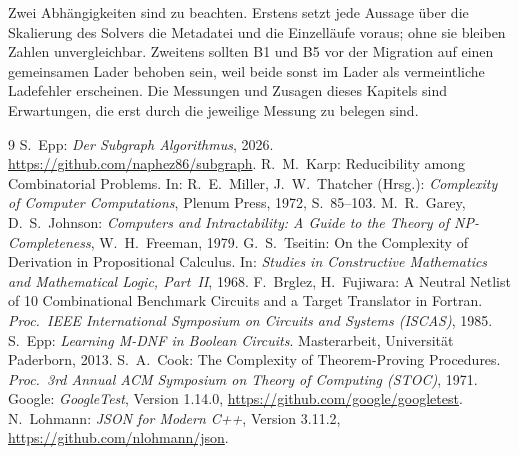 Zwei Abhängigkeiten sind zu beachten. Erstens setzt jede Aussage über die Skalierung des Solvers die Metadatei und die Einzelläufe voraus; ohne sie bleiben Zahlen unvergleichbar. Zweitens sollten B1 und B5 vor der Migration auf einen gemeinsamen Lader behoben sein, weil beide sonst im Lader als vermeintliche Ladefehler erscheinen. Die Messungen und Zusagen dieses Kapitels sind Erwartungen, die erst durch die jeweilige Messung zu belegen sind.

\begin{thebibliography}{9}
	 S.~Epp: \emph{Der Subgraph Algorithmus}, 2026. \url{https://github.com/naphez86/subgraph}.
	 R.~M.~Karp: Reducibility among Combinatorial Problems. In: R.~E.~Miller, J.~W.~Thatcher (Hrsg.): \emph{Complexity of Computer Computations}, Plenum Press, 1972, S.~85--103.
	 M.~R.~Garey, D.~S.~Johnson: \emph{Computers and Intractability: A Guide to the Theory of NP-Completeness}, W.~H.~Freeman, 1979.
	 G.~S.~Tseitin: On the Complexity of Derivation in Propositional Calculus. In: \emph{Studies in Constructive Mathematics and Mathematical Logic, Part~II}, 1968.
	 F.~Brglez, H.~Fujiwara: A Neutral Netlist of 10 Combinational Benchmark Circuits and a Target Translator in Fortran. \emph{Proc.\ IEEE International Symposium on Circuits and Systems (ISCAS)}, 1985.
	 S.~Epp: \emph{Learning M-DNF in Boolean Circuits}. Masterarbeit, Universität Paderborn, 2013.
	 S.~A.~Cook: The Complexity of Theorem-Proving Procedures. \emph{Proc.\ 3rd Annual ACM Symposium on Theory of Computing (STOC)}, 1971.
	 Google: \emph{GoogleTest}, Version 1.14.0, \url{https://github.com/google/googletest}.
	 N.~Lohmann: \emph{JSON for Modern C++}, Version 3.11.2, \url{https://github.com/nlohmann/json}.
\end{thebibliography}
